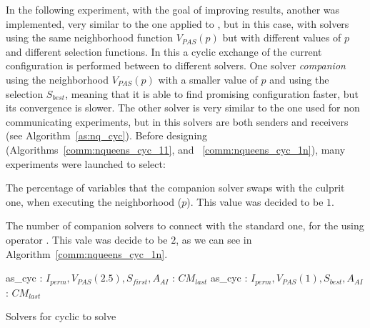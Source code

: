 \separation

In the following experiment, with the goal of improving results, another \commstr{} was implemented, very similar to the one applied to \SGP{}, but in this case, with solvers using the same neighborhood function $V_{PAS}(p)$ but with different values of $p$ and different selection functions. In this \commstr{} a cyclic exchange of the current configuration is performed between to different solvers. One solver \textit{companion} using the neighborhood \om{} $V_{PAS}(p)$ with a smaller value of $p$ and using the selection \om{} $S_{best}$, meaning that it is able to find promising configuration faster, but its convergence is slower. 
The other solver is very similar to the one used for non communicating experiments, but in this \commstr{} solvers are both senders and receivers (see Algorithm~\ref{as:nq_cyc}). Before designing \commstrs{} (Algorithms~\ref{comm:nqueens_cyc_11}, and ~\ref{comm:nqueens_cyc_1n}), many experiments were launched to select: \begin{inparaenum} \item The percentage of variables that the companion solver swaps with the culprit one, when executing the neighborhood \om{} ($p$). This value was decided to be $1$. \item The number of companion solvers to connect with the standard one, for the \commstr{} using operator \oneTn. This vale was decide to be $2$, as we can see in Algorithm~\ref{comm:nqueens_cyc_1n}. \end{inparaenum} 

\begin{algorithm}[H]
\dontprintsemicolon
\SetNoline
{}
   as\_cyc\;
\algoindent {} : $I_{perm}, V_{PAS}(2.5), S_{first}, A_{AI}$ \;
\algoindent {}: $CM_{last}$\;
   as\_cyc\;
\algoindent {} : $I_{perm}, V_{PAS}(1), S_{best}, A_{AI}$ \;
\algoindent {}: $CM_{last}$\;
\caption{Solvers for cyclic \commstr{} to solve \NQP{}}\label{as:nq_cyc}
\end{algorithm}

